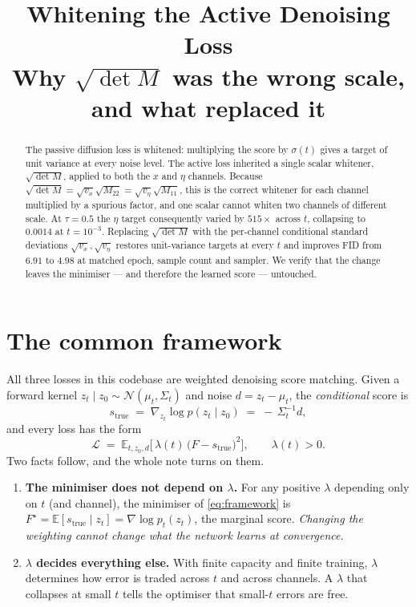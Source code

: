 \documentclass[11pt]{article}
\title{Whitening the Active Denoising Loss\\
\large Why $\sqrt{\det M}$ was the wrong scale, and what replaced it}
\author{}
\date{}
\newcommand{\tauu}{\tau}
\newcommand{\Nor}{\mathcal{N}}
\begin{document}
\maketitle

\begin{abstract}
The passive diffusion loss is whitened: multiplying the score by $\sigma(t)$ gives a
target of unit variance at every noise level. The active loss inherited a single scalar
whitener, $\sqrt{\det M}$, applied to both the $x$ and $\eta$ channels. Because
$\sqrt{\det M}=\sqrt{v_x}\sqrt{M_{22}}=\sqrt{v_\eta}\sqrt{M_{11}}$, this is the correct
whitener for each channel multiplied by a spurious factor, and one scalar cannot whiten
two channels of different scale. At $\tauu=0.5$ the $\eta$ target consequently varied by
$515\times$ across $t$, collapsing to $0.0014$ at $t=10^{-3}$. Replacing $\sqrt{\det M}$
with the per-channel conditional standard deviations $\sqrt{v_x},\sqrt{v_\eta}$ restores
unit-variance targets at every $t$ and improves FID from $6.91$ to $4.98$ at matched
epoch, sample count and sampler. We verify that the change leaves the minimiser --- and
therefore the learned score --- untouched.
\end{abstract}

\section{The common framework}
\label{sec:framework}

All three losses in this codebase are weighted denoising score matching. Given a forward
kernel $z_t\mid z_0 \sim \Nor(\mu_t, \Sigma_t)$ and noise $d = z_t-\mu_t$, the
\emph{conditional} score is
\begin{equation}
s_{\text{true}} \;=\; \nabla_{z_t}\log p(z_t\mid z_0) \;=\; -\,\Sigma_t^{-1} d ,
\label{eq:strue}
\end{equation}
and every loss has the form
\begin{equation}
\mathcal{L} \;=\; \mathbb{E}_{t,z_0,d}\Big[\,\lambda(t)\,\big(F - s_{\text{true}}\big)^{2}\Big],
\qquad \lambda(t) > 0 .
\label{eq:framework}
\end{equation}
Two facts follow, and the whole note turns on them.

\begin{enumerate}\itemsep3pt
\item \textbf{The minimiser does not depend on $\lambda$.} For any positive $\lambda$
      depending only on $t$ (and channel), the minimiser of \eqref{eq:framework} is
      $F^\star = \mathbb{E}[s_{\text{true}}\mid z_t] = \nabla\log p_t(z_t)$, the marginal
      score. \emph{Changing the weighting cannot change what the network learns at
      convergence.}
\item \textbf{$\lambda$ decides everything else.} With finite capacity and finite
      training, $\lambda$ determines how error is traded across $t$ and across channels.
      A $\lambda$ that collapses at small $t$ tells the optimiser that small-$t$ errors are
      free.
\end{enumerate}
\end{document}
